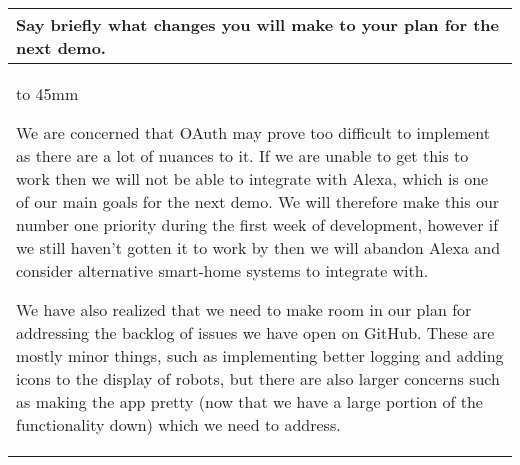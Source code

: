 \documentclass[a4paper]{article}
\newcommand{\colWidth}{141mm}
\begin{document}
\begin{center}
\begin{tabular}{|p{\colWidth}|}
	\hline
	\cellcolor{blue!25}\large
	\textbf{Say briefly what changes you will make to your plan for the next demo.}
	\\ \hline
	\vtop to 45mm{
		We are concerned that OAuth may prove too difficult to implement as there are a lot of nuances to it.
		If we are unable to get this to work then we will not be able to integrate with Alexa, which is one of
		our main goals for the next demo. We will therefore make this our number one priority during the first
		week of development, however if we still haven't gotten it to work by then we will abandon Alexa and
		consider alternative smart-home systems to integrate with.

		\vspace{2mm}

		We have also realized that we need to make room in our plan for addressing the backlog of issues we have
		open on GitHub. These are mostly minor things, such as implementing better logging and adding icons to the display of robots,
		but there are also larger concerns such as making the app pretty (now that we have a large portion of the functionality down)
		which we need to address.
  	}
  \\
  \hline
\end{tabular}

\end{center}
  
\end{document}
